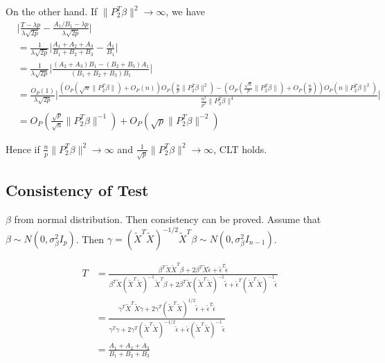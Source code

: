 \documentclass[review]{elsarticle}
\theoremstyle{plain}
\theoremstyle{definition}
\theoremstyle{remark}
\begin{document}
On the other hand. If $\|P_2^T\beta\|^2\to \infty$, we have
\begin{equation}
    \begin{aligned}
        &\Big|\frac{T-{\lambda p}}{\lambda\sqrt{2p}
        }-
    \frac{{A_1}/{B_1}-{\lambda p}}{\lambda\sqrt{2p}
        }\Big|\\
        &=
        \frac{1}{\lambda\sqrt{2p}}
        \Big|
        \frac{A_1+A_2+A_3}{B_1+B_2+B_3}-\frac{A_1}{B_1}
        \Big|\\
        &=
        \frac{1}{\lambda\sqrt{2p}}
        \Big|
        \frac{(A_2+A_3)B_1-(B_2+B_3)A_1}{(B_1+B_2+B_3)B_1}
        \Big|\\
        &=
        \frac{O_{P}(1)}{\lambda\sqrt{2p}}
        \Big|
        \frac{(O_P(\sqrt{n}\|P_2^T\beta\|)+O_P(n))O_P(\frac{n}{p}\|P_2^T\beta\|^2)-(O_P(\frac{\sqrt{n}}{p}\|P_2^T\beta\|)+O_P(\frac{n}{p}))O_P(n\|P_2^T\beta\|^2)}{\frac{n^2}{p^2}\|P_2^T\beta\|^4}
        \Big|\\
        &=O_P(\frac{\sqrt{p}}{\sqrt{n}}\|P_2^T\beta\|^{-1})+O_P(\sqrt{p}\|P_2^T\beta\|^{-2})
    \end{aligned}
\end{equation}

Hence if $\frac{n}{p}\|P_2^T\beta\|^2\to \infty$ and $\frac{1}{\sqrt{p}}\|P_2^T\beta\|^2\to \infty$, CLT holds.

\subsection{Consistency of Test}
$\beta$ from normal distribution. Then consistency can be proved.
Assume that $\beta\sim N(0,\sigma^2_{\beta}I_{p})$. Then
$\gamma={(\tilde{X}^T \tilde{X})}^{-1/2}\tilde{X}^T\beta\sim N(0,\sigma^2_{\beta}I_{n-1})$.


\begin{equation}
    \begin{aligned}
        T&=\frac{\beta^T \tilde{X}\tilde{X}^T \beta+
        2\beta^T \tilde{X}\tilde{\epsilon}+
        \tilde{\epsilon}^T\tilde{\epsilon}
    }{\beta^T \tilde{X}{(\tilde{X}^T\tilde{X})}^{-1}\tilde{X}^T \beta+
        2\beta^T \tilde{X}{(\tilde{X}^T\tilde{X})}^{-1}\tilde{\epsilon}+
        \tilde{\epsilon}^T{(\tilde{X}^T\tilde{X})}^{-1}\tilde{\epsilon}
    }\\
        &=\frac{\gamma^T\tilde{X}^T\tilde{X}\gamma+2\gamma^T{(\tilde{X}^T\tilde{X})}^{1/2}\tilde{\epsilon}+\tilde{\epsilon}^T\tilde{\epsilon}}{\gamma^T\gamma+2\gamma^T{(\tilde{X}^T\tilde{X})}^{-1/2}\tilde{\epsilon}+\tilde{\epsilon}{(\tilde{X}^T\tilde{X})}^{-1}\tilde{\epsilon}}\\
        &=\frac{A_1+A_2+A_3}{B_1+B_2+B_3}
    \end{aligned}
\end{equation}
\end{document}
